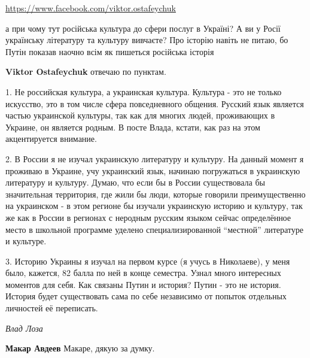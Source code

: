 \begin{itemize}

\url{https://www.facebook.com/viktor.ostafeychuk}

а при чому тут російська культура до сфери послуг в Україні? А ви у Росії
українську літературу та культуру вивчаєте? Про історію навіть не питаю, бо
Путін показав наочно всім як пишеться російська історія


\textbf{Viktor Ostafeychuk} отвечаю по пунктам.

1. Не российская культура, а украинская культура. Культура - это не только
искусство, это в том числе сфера повседневного общения. Русский язык является
частью украинской культуры, так как для многих людей, проживающих в Украине, он
является родным. В посте Влада, кстати, как раз на этом акцентируется внимание.

2. В России я не изучал украинскую литературу и культуру. На данный момент я
проживаю в Украине, учу украинский язык, начинаю погружаться в украинскую
литературу и культуру. Думаю, что если бы в России существовала бы значительная
территория, где жили бы люди, которые говорили преимущественно на украинском -
в этом регионе бы изучали украинскую историю и культуру, так же как в России в
регионах с неродным русским языком сейчас определённое место в школьной
программе уделено специализированной \enquote{местной} литературе и культуре.

3. Историю Украины я изучал на первом курсе (я учусь в Николаеве), у меня было,
кажется, 82 балла по ней в конце семестра. Узнал много интересных моментов для
себя. Как связаны Путин и история? Путин - это не история. История будет
существовать сама по себе независимо от попыток отдельных личностей её
переписать.

\emph{Влад Лоза}

\textbf{Макар Авдеев} Макаре, дякую за думку. 


\end{itemize}
